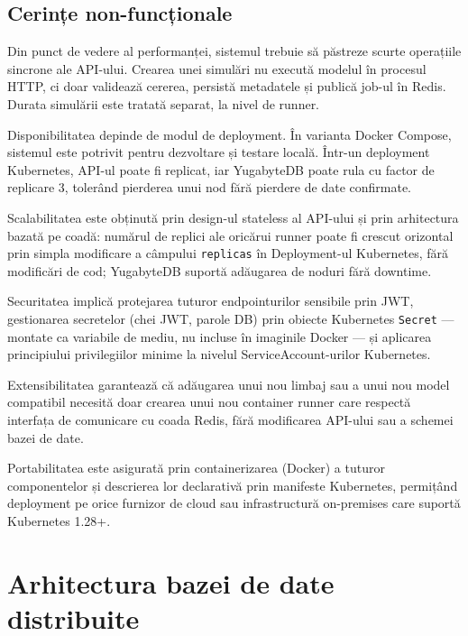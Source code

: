 \subsection{Cerințe non-funcționale}
\label{subsec:cerinte_nonfunctionale}

Din punct de vedere al performanței, sistemul trebuie să păstreze scurte
operațiile sincrone ale API-ului. Crearea unei simulări nu execută modelul în
procesul HTTP, ci doar validează cererea, persistă metadatele și publică job-ul
în Redis. Durata simulării este tratată separat, la nivel de runner.

Disponibilitatea depinde de modul de deployment. În varianta Docker Compose,
sistemul este potrivit pentru dezvoltare și testare locală. Într-un deployment
Kubernetes, API-ul poate fi replicat, iar YugabyteDB poate rula cu factor de
replicare 3, tolerând pierderea unui nod fără pierdere de date confirmate.

Scalabilitatea este obținută prin design-ul stateless al API-ului și
prin arhitectura bazată pe coadă: numărul de replici ale oricărui runner poate
fi crescut orizontal prin simpla modificare a câmpului \texttt{replicas} în
Deployment-ul Kubernetes, fără modificări de cod; YugabyteDB suportă adăugarea
de noduri fără downtime.

Securitatea implică protejarea tuturor endpointurilor sensibile prin
JWT, gestionarea secretelor (chei JWT, parole DB) prin obiecte Kubernetes
\texttt{Secret} --- montate ca variabile de mediu, nu incluse în imaginile
Docker --- și aplicarea principiului privilegiilor minime la nivelul
ServiceAccount-urilor Kubernetes.

Extensibilitatea garantează că adăugarea unui nou limbaj sau a unui nou model
compatibil necesită doar crearea unui nou container runner care respectă
interfața de comunicare cu coada Redis, fără modificarea API-ului sau a schemei
bazei de date.

Portabilitatea este asigurată prin containerizarea (Docker) a tuturor
componentelor și descrierea lor declarativă prin manifeste Kubernetes, permițând
deployment pe orice furnizor de cloud sau infrastructură on-premises care
suportă Kubernetes 1.28+.

\section{Arhitectura bazei de date distribuite}
\label{sec:arhitectura_bd}

